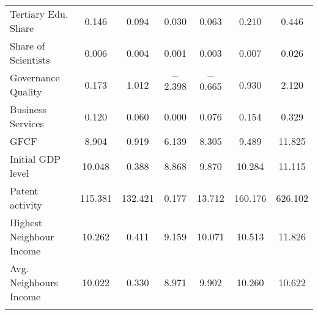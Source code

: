 \documentclass[11pt]{article}
\begin{document}
\begin{table}[!htbp]
\begin{tabular}{@{\extracolsep{5pt}}lcccccc}
Tertiary Edu. Share & 0.146 & 0.094 & 0.030 & 0.063 & 0.210 & 0.446 \\ 
Share of Scientists & 0.006 & 0.004 & 0.001 & 0.003 & 0.007 & 0.026 \\ 
Governance Quality & 0.173 & 1.012 & $-$2.398 & $-$0.665 & 0.930 & 2.120 \\  
Business Services & 0.120 & 0.060 & 0.000 & 0.076 & 0.154 & 0.329 \\ 
GFCF & 8.904 & 0.919 & 6.139 & 8.305 & 9.489 & 11.825 \\  
Initial GDP level & 10.048 & 0.388 & 8.868 & 9.870 & 10.284 & 11.115 \\ 
Patent activity  & 115.381 & 132.421 & 0.177 & 13.712 & 160.176 & 626.102 \\ 
Highest Neighbour Income & 10.262 & 0.411 & 9.159 & 10.071 & 10.513 & 11.826 \\ 
Avg. Neighbours Income &  10.022 & 0.330 & 8.971 & 9.902 & 10.260 & 10.622 \\ 
\hline \\[-1.8ex] 
\end{tabular} 
\end{table} 
\end{document}
